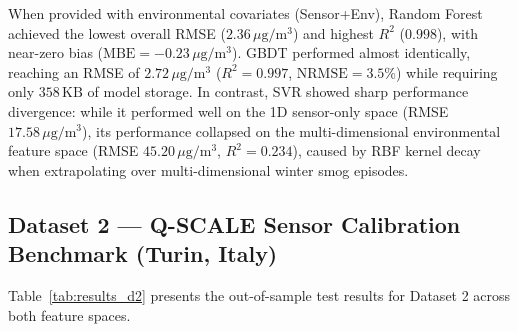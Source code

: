 \documentclass[11pt,a4paper]{article}
\begin{document}
When provided with environmental covariates (Sensor+Env), Random Forest achieved the lowest overall RMSE ($2.36\,\mu\text{g}/\text{m}^3$) and highest $R^2$ ($0.998$), with near-zero bias ($\text{MBE} = -0.23\,\mu\text{g}/\text{m}^3$). GBDT performed almost identically, reaching an RMSE of $2.72\,\mu\text{g}/\text{m}^3$ ($R^2 = 0.997$, $\text{NRMSE} = 3.5\%$) while requiring only $358\,\text{KB}$ of model storage. In contrast, SVR showed sharp performance divergence: while it performed well on the 1D sensor-only space (RMSE $17.58\,\mu\text{g}/\text{m}^3$), its performance collapsed on the multi-dimensional environmental feature space (RMSE $45.20\,\mu\text{g}/\text{m}^3$, $R^2 = 0.234$), caused by RBF kernel decay when extrapolating over multi-dimensional winter smog episodes.

\subsection{Dataset 2 --- Q-SCALE Sensor Calibration Benchmark (Turin, Italy)}
Table~\ref{tab:results_d2} presents the out-of-sample test results for Dataset 2 across both feature spaces.
\end{document}
